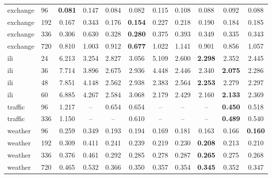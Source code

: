 \begin{tabular}{llccccccccc}
exchange & 96 & \textbf{0.081} & 0.147 & 0.084 & 0.082 & 0.115 & 0.108 & 0.088 & 0.092 & 0.088 \\
exchange & 192 & 0.167 & 0.343 & 0.176 & \textbf{0.154} & 0.227 & 0.218 & 0.190 & 0.184 & 0.185 \\
exchange & 336 & 0.306 & 0.630 & 0.328 & \textbf{0.280} & 0.375 & 0.393 & 0.349 & 0.335 & 0.343 \\
exchange & 720 & 0.810 & 1.003 & 0.912 & \textbf{0.677} & 1.022 & 1.141 & 0.901 & 0.856 & 1.057 \\
ili & 24 & 6.213 & 3.254 & 2.827 & 3.056 & 5.109 & 2.600 & \textbf{2.298} & 2.352 & 2.445 \\
ili & 36 & 7.714 & 3.896 & 2.675 & 2.936 & 4.448 & 2.446 & 2.340 & \textbf{2.075} & 2.286 \\
ili & 48 & 7.851 & 4.148 & 2.562 & 2.938 & 2.383 & 2.564 & \textbf{2.253} & 2.279 & 2.297 \\
ili & 60 & 6.885 & 4.267 & 2.584 & 3.068 & 2.179 & 2.429 & 2.160 & \textbf{2.133} & 2.369 \\
traffic & 96 & 1.217 & -- & 0.654 & 0.654 & -- & -- & -- & \textbf{0.450} & 0.518 \\
traffic & 336 & 1.150 & -- & -- & 0.610 & -- & -- & -- & \textbf{0.489} & 0.540 \\
weather & 96 & 0.259 & 0.349 & 0.193 & 0.194 & 0.169 & 0.181 & 0.163 & 0.166 & \textbf{0.160} \\
weather & 192 & 0.309 & 0.411 & 0.241 & 0.239 & 0.219 & 0.230 & \textbf{0.208} & 0.213 & 0.210 \\
weather & 336 & 0.376 & 0.461 & 0.292 & 0.285 & 0.278 & 0.287 & \textbf{0.265} & 0.275 & 0.268 \\
weather & 720 & 0.465 & 0.532 & 0.366 & 0.350 & 0.357 & 0.354 & \textbf{0.345} & 0.352 & 0.347 \\
\bottomrule
\end{tabular}